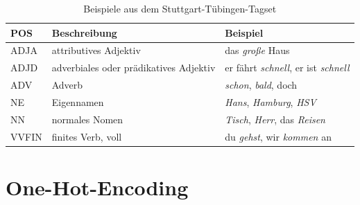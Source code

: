 \begin{table}[h]
    \caption{Beispiele aus dem Stuttgart-Tübingen-Tagset}
    \label{STTS}
    \renewcommand{\arraystretch}{1.2}
    \centering
    \sffamily
    \begin{footnotesize}
        \begin{tabular}{l l l}
            \toprule
            \textbf{POS} & \textbf{Beschreibung}                  & \textbf{Beispiel}                                  \\
            \midrule
            ADJA         & attributives Adjektiv                  & das \textit{große} Haus                            \\
            ADJD         & adverbiales oder prädikatives Adjektiv & er fährt \textit{schnell}, er ist \textit{schnell} \\
            ADV          & Adverb                                 & \textit{schon}, \textit{bald}, doch                \\
            NE           & Eigennamen                             & \textit{Hans}, \textit{Hamburg}, \textit{HSV}      \\
            NN           & normales Nomen                         & \textit{Tisch}, \textit{Herr}, das \textit{Reisen} \\
            VVFIN        & finites Verb, voll                     & du \textit{gehst}, wir \textit{kommen} an          \\
            \bottomrule
        \end{tabular}
    \end{footnotesize}
    \rmfamily
\end{table}




\section{One-Hot-Encoding}


